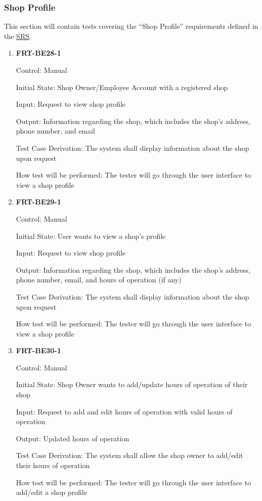 \documentclass[12pt, titlepage]{article}
\begin{document}
\subsubsection{Shop Profile}

This section will contain tests covering the ``Shop Profile'' requirements defined in the
\href{https://github.com/arkinmodi/project-sayyara/blob/main/docs/SRS/SRS.pdf}{SRS}.

\begin{enumerate}
	\item \textbf{FRT-BE28-1}

	      Control: Manual

	      Initial State: Shop Owner/Employee Account with a registered shop

	      Input: Request to view shop profile

	      Output: Information regarding the shop, which includes the shop's address, phone number, and email

	      Test Case Derivation: The system shall display information about the shop upon request

	      How test will be performed: The tester will go through the user interface to view a shop profile

	\item \textbf{FRT-BE29-1}

	      Control: Manual

	      Initial State: User wants to view a shop's profile

	      Input: Request to view shop profile

	      Output: Information regarding the shop, which includes the shop's address, phone number, email, and
	      hours of operation (if any)

	      Test Case Derivation: The system shall display information about the shop upon request

	      How test will be performed: The tester will go through the user interface to view a shop profile

	\item \textbf{FRT-BE30-1}

	      Control: Manual

	      Initial State: Shop Owner wants to add/update hours of operation of their shop

	      Input: Request to add and edit hours of operation with valid hours of operation

	      Output: Updated hours of operation

	      Test Case Derivation: The system shall allow the shop owner to add/edit their hours of operation

	      How test will be performed: The tester will go through the user interface to add/edit a shop
	      profile

\end{enumerate}
\end{document}
